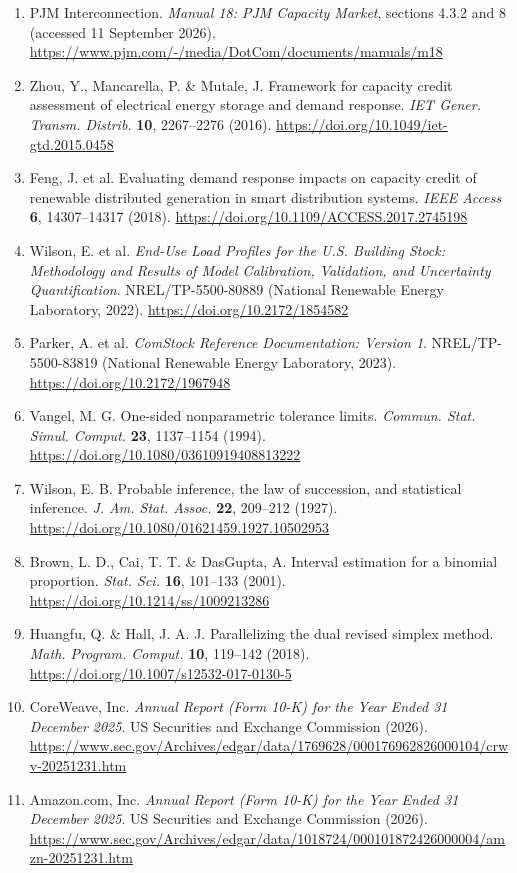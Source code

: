 \documentclass[10pt,a4paper]{article}
\begin{document}
{\begin{enumerate}[label=\arabic*.,leftmargin=*,itemsep=2.5pt]
\item PJM Interconnection. \emph{Manual 18: PJM Capacity Market}, sections 4.3.2 and 8 (accessed 11 September 2026). \url{https://www.pjm.com/-/media/DotCom/documents/manuals/m18}
\item Zhou, Y., Mancarella, P. \& Mutale, J. Framework for capacity credit assessment of electrical energy storage and demand response. \emph{IET Gener. Transm. Distrib.} \textbf{10}, 2267–2276 (2016). \url{https://doi.org/10.1049/iet-gtd.2015.0458}
\item Feng, J. et al. Evaluating demand response impacts on capacity credit of renewable distributed generation in smart distribution systems. \emph{IEEE Access} \textbf{6}, 14307–14317 (2018). \url{https://doi.org/10.1109/ACCESS.2017.2745198}
\item Wilson, E. et al. \emph{End-Use Load Profiles for the U.S. Building Stock: Methodology and Results of Model Calibration, Validation, and Uncertainty Quantification}. NREL/TP-5500-80889 (National Renewable Energy Laboratory, 2022). \url{https://doi.org/10.2172/1854582}
\item Parker, A. et al. \emph{ComStock Reference Documentation: Version 1}. NREL/TP-5500-83819 (National Renewable Energy Laboratory, 2023). \url{https://doi.org/10.2172/1967948}
\item Vangel, M. G. One-sided nonparametric tolerance limits. \emph{Commun. Stat. Simul. Comput.} \textbf{23}, 1137–1154 (1994). \url{https://doi.org/10.1080/03610919408813222}
\item Wilson, E. B. Probable inference, the law of succession, and statistical inference. \emph{J. Am. Stat. Assoc.} \textbf{22}, 209–212 (1927). \url{https://doi.org/10.1080/01621459.1927.10502953}
\item Brown, L. D., Cai, T. T. \& DasGupta, A. Interval estimation for a binomial proportion. \emph{Stat. Sci.} \textbf{16}, 101–133 (2001). \url{https://doi.org/10.1214/ss/1009213286}
\item Huangfu, Q. \& Hall, J. A. J. Parallelizing the dual revised simplex method. \emph{Math. Program. Comput.} \textbf{10}, 119–142 (2018). \url{https://doi.org/10.1007/s12532-017-0130-5}
\item CoreWeave, Inc. \emph{Annual Report (Form 10-K) for the Year Ended 31 December 2025}. US Securities and Exchange Commission (2026). \url{https://www.sec.gov/Archives/edgar/data/1769628/000176962826000104/crwv-20251231.htm}
\item Amazon.com, Inc. \emph{Annual Report (Form 10-K) for the Year Ended 31 December 2025}. US Securities and Exchange Commission (2026). \url{https://www.sec.gov/Archives/edgar/data/1018724/000101872426000004/amzn-20251231.htm}

\end{enumerate}}
\end{document}
